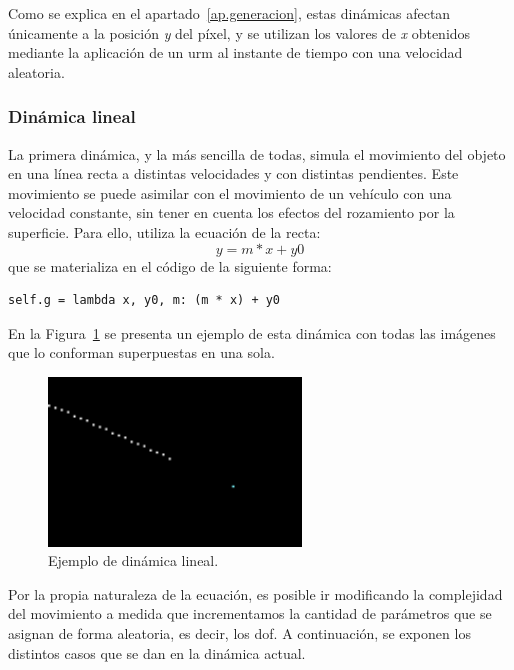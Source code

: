 Como se explica en el apartado~\ref{ap.generacion}, estas dinámicas afectan únicamente a la posición \textit{y} del píxel, y se utilizan los valores de \textit{x} obtenidos mediante la aplicación de un \acrfull{urm} al instante de tiempo con una velocidad aleatoria.\\

\subsubsection{Dinámica lineal}

La primera dinámica, y la más sencilla de todas, simula el movimiento del objeto en una línea recta a distintas velocidades y con distintas pendientes. Este movimiento se puede asimilar con el movimiento de un vehículo con una velocidad constante, sin tener en cuenta los efectos del rozamiento por la superficie. Para ello, utiliza la ecuación de la recta:
$$y = m*x + y0$$
que se materializa en el código de la siguiente forma:
\vspace{10pt}
\begin{lstlisting}[frame=single]
  self.g = lambda x, y0, m: (m * x) + y0
\end{lstlisting}

En la Figura~\ref{fig.lineal} se presenta un ejemplo de esta dinámica con todas las imágenes que lo conforman superpuestas en una sola.

\begin{figure}[H]
		\begin{center}
			\includegraphics[width=0.6\textwidth]{Memoria-TFM/figures/samples/linear2_sample.png}
			\caption{Ejemplo de dinámica lineal.}
			\label{fig.lineal}
		\end{center}
\end{figure}

Por la propia naturaleza de la ecuación, es posible ir modificando la complejidad del movimiento a medida que incrementamos la cantidad de parámetros que se asignan de forma aleatoria, es decir, los \acrshort{dof}. A continuación, se exponen los distintos casos que se dan en la dinámica actual.

